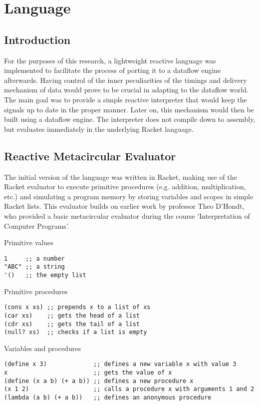 \chapter{Language}
\lstset{language=lisp,showtabs=false}

\section{Introduction}

For the purposes of this research, a lightweight reactive language was implemented to facilitate the process of porting it to a dataflow engine afterwards. Having control of the inner peculiarities of the timings and delivery mechanism of data would prove to be crucial in adapting to the dataflow world. The main goal was to provide a simple reactive interpreter that would keep the signals up to date in the proper manner. Later on, this mechanism would then be built using a dataflow engine.
The interpreter does not compile down to assembly, but evaluates immediately in the underlying Racket language. 
\newpage

\section{Reactive Metacircular Evaluator}

The initial version of the language was written in Racket, making use of the Racket evaluator to execute primitive procedures (e.g. addition, multiplication, etc.) and simulating a program memory by storing variables and scopes in simple Racket lists. This evaluator builds on earlier work by professor Theo D'Hondt, who provided a basic metacircular evaluator during the course 'Interpretation of Computer Programs'. 

Primitive values
\begin{lstlisting}
1     ;; a number
"ABC" ;; a string
'()   ;; the empty list
\end{lstlisting}

Primitive procedures
\begin{lstlisting}
(cons x xs) ;; prepends x to a list of xs
(car xs)    ;; gets the head of a list
(cdr xs)    ;; gets the tail of a list
(null? xs)  ;; checks if a list is empty
\end{lstlisting}

Variables and procedures
\begin{lstlisting}
(define x 3)             ;; defines a new variable x with value 3
x                        ;; gets the value of x
(define (x a b) (+ a b)) ;; defines a new procedure x
(x 1 2)                  ;; calls a procedure x with arguments 1 and 2
(lambda (a b) (+ a b))   ;; defines an anonymous procedure
\end{lstlisting}

